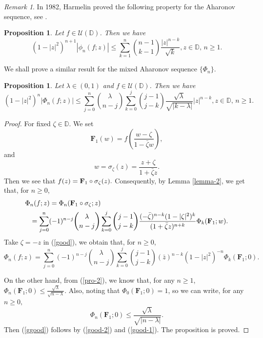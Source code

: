 \documentclass[10pt]{amsart}
\newtheorem{proposition}[theorem]{Proposition}
\theoremstyle{definition}
\theoremstyle{remark}
\newtheorem{remark}[theorem]{Remark}
\numberwithin{equation}{section}
\begin{document}
\begin{remark}
In 1982, Harmelin proved the following property for the Aharonov sequence, see  \cite[Theorem 1]{Ha-1}. 
\begin{proposition}
Let $f\in \mathcal{U}(\mathbb{D})$. Then we have 
\begin{equation}\label{harmelin-est}
(1-|z|^2)^{n+1}|\phi_n(f; z)|\leq \sum_{k=1}^{n}\binom{n-1}{k-1}\frac{|z|^{n-k}}{\sqrt{k}}, z\in \mathbb{D},\, n\geq 1. \nonumber
\end{equation}
\end{proposition}
We shall prove a similar result for the mixed Aharonov sequence $\{\Phi_n\}$.
\begin{proposition}\label{mixed-est}
Let $\lambda\in (0,1)$ and $f\in \mathcal{U}(\mathbb{D})$.  Then we have 
\begin{equation}\label{ggood}
(1-|z|^2)^n|\Phi_{n}(f; z)|\leq \sum_{j=0}^{n}\binom{\lambda}{n-j}\sum_{k=0}^{j}\binom{j-1}{j-k}\frac{\sqrt{\lambda}}{\sqrt{|k-\lambda|}}|{z}|^{n-k}, z\in \mathbb{D},\, n\geq 1. 
\end{equation}
\end{proposition}
\begin{proof}
For fixed $\zeta \in \mathbb{D}$. We set
$$\mathbf{F}_1(w)=f\left(\frac{w-\zeta}{1-\bar{\zeta}w}\right),$$
and $$w=\sigma_\zeta(z)=\frac{z+\zeta}{1+\bar{\zeta}z}. $$
Then we see that $f(z)={\bf F}_1 \circ \sigma_\zeta(z).$ Consequently, by Lemma \ref{lemma-2}, we get that, for $n\geq 0$, 
\begin{eqnarray}\label{good}
\lefteqn{\Phi_{n}(f; z)=\Phi_{n}(\mathbf{F}_{1}\circ \sigma_\zeta; z) } \\
&&=\sum_{j=0}^{n}(-1)^{n-j}\binom{\lambda}{n-j}\sum_{k=0}^{j}\binom{j-1}{j-k}\frac{(-\bar{\zeta})^{n-k}(1-|\zeta|^2)^{k}}{(1+\bar{\zeta}z)^{n+k}}\Phi_{k}(\mathbf{F}_{1}; w). \nonumber
\end{eqnarray}
Take $\zeta=-z$ in (\ref{good}), we obtain that, for $n\geq 0$, 
\begin{equation}\label{good-1}
\Phi_{n}(f; z)=\sum_{j=0}^{n}(-1)^{n-j}\binom{\lambda}{n-j}\sum_{k=0}^{j}\binom{j-1}{j-k}(\bar{z})^{n-k}(1-|z|^2)^{-n}\Phi_{k}(\mathbf{F}_{1}; 0). 
\end{equation}

On the other hand, from (\ref{pro-2}), we know that, for any $n\geq 1$,
$\Phi_{n}(\mathbf{F}_{1}; 0)\leq \frac{\sqrt{\lambda}}{\sqrt{n-\lambda}}.$
Also, noting that $\Phi_{0}(\mathbf{F}_{1}; 0)=1$, so we can write, for any $n\geq 0,$ 
 \begin{equation}\label{good-2}\Phi_{n}(\mathbf{F}_{1}; 0)\leq \frac{\sqrt{\lambda}}{\sqrt{|n-\lambda|}}.\end{equation}
Then (\ref{ggood}) follows by (\ref{good-2}) and (\ref{good-1}). The proposition is proved.
\end{proof}
\end{remark}
\end{document}
